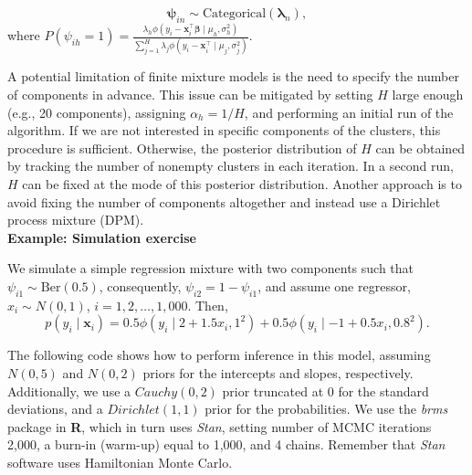 $$\bm{\psi}_{in}\sim \text{Categorical}(\bm{\lambda}_n),$$
where $P(\psi_{ih}=1)=\frac{\lambda_{h}\phi(y_i-\bm{x}_i^{\top}\bm{\beta} \mid \mu_h,\sigma_h^2)}{\sum_{j=1}^H\lambda_{j}\phi(y_i-\bm{x}_i^{\top} \mid \mu_j,\sigma_j^2)}$.
 
A potential limitation of finite mixture models is the need to specify the number of components in advance. This issue can be mitigated by setting $H$ large enough (e.g., 20 components), assigning $\alpha_h = 1/H$, and performing an initial run of the algorithm. If we are not interested in specific components of the clusters, this procedure is sufficient. Otherwise, the posterior distribution of $H$ can be obtained by tracking the number of nonempty clusters in each iteration. In a second run, $H$ can be fixed at the mode of this posterior distribution. Another approach is to avoid fixing the number of components altogether and instead use a Dirichlet process mixture (DPM).\\

\textbf{Example: Simulation exercise}

We simulate a simple regression mixture with two components such that $\psi_{i1}\sim \text{Ber}(0.5)$, consequently, $\psi_{i2}=1-\psi_{i1}$, and assume one regressor, $x_i\sim N(0,1)$, $i=1,2,\dots,1,000$. Then, 
$$p(y_i \mid \bm{x}_i) = 
0.5 \phi(y_i \mid 2+1.5x_i,1^2)+0.5 \phi(y_i \mid -1+0.5x_i,0.8^2).$$

The following code shows how to perform inference in this model, assuming $N(0,5)$ and $N(0,2)$ priors for the intercepts and slopes, respectively. Additionally, we use a $Cauchy(0,2)$ prior truncated at 0 for the standard deviations, and a $Dirichlet(1,1)$ prior for the probabilities. We use the \textit{brms} package in \textbf{R}, which in turn uses \textit{Stan}, setting number of MCMC iterations 2,000, a burn-in (warm-up) equal to 1,000, and 4 chains. Remember that \textit{Stan} software uses Hamiltonian Monte Carlo. 

